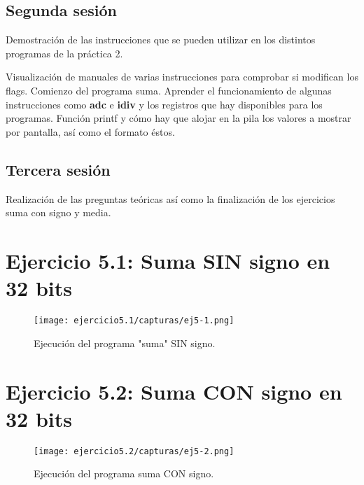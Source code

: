 \subsection {Segunda sesión}
Demostración de las instrucciones que se pueden utilizar en los distintos programas de la práctica 2. 

Visualización de manuales de varias instrucciones para comprobar si modifican los flags. 
Comienzo del programa suma.
Aprender el funcionamiento de algunas instrucciones como \textbf{adc} e \textbf{idiv} y los registros que hay disponibles para los programas.
Función printf y cómo hay que alojar en la pila los valores a mostrar por pantalla, así como el formato éstos.

\subsection {Tercera sesión}
Realización de las preguntas teóricas así como la finalización de los ejercicios suma con signo y media.


\section{Ejercicio 5.1: Suma SIN signo en 32 bits}



\begin{figure}[H] %
	\centering
	\texttt{[image: ejercicio5.1/capturas/ej5-1.png]} 
	\caption{Ejecución del programa "suma" SIN signo.} 
	\label{fig:figura1}
\end{figure}

\newpage

\section{Ejercicio 5.2: Suma CON signo en 32 bits}



\begin{figure}[H] %
	\centering
	\texttt{[image: ejercicio5.2/capturas/ej5-2.png]}  
	\caption{Ejecución del programa suma CON signo.} 
	\label{fig:figura2}
\end{figure}

